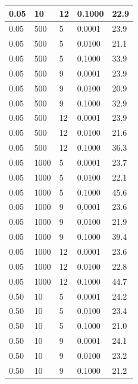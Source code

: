 \begin{table}[h!]
\begin{center}
\begin{tabular}{|l|l|l|l|l|}
\hline 0.05 & 10 & 12 & 0.1000 & 22.9 \\
\hline 0.05 & 500 & 5 & 0.0001 & 23.9 \\
\hline 0.05 & 500 & 5 & 0.0100 & 21.1 \\
\hline 0.05 & 500 & 5 & 0.1000 & 33.9 \\
\hline 0.05 & 500 & 9 & 0.0001 & 23.9 \\
\hline 0.05 & 500 & 9 & 0.0100 & 20.9 \\
\hline 0.05 & 500 & 9 & 0.1000 & 32.9 \\
\hline 0.05 & 500 & 12 & 0.0001 & 23.9 \\
\hline 0.05 & 500 & 12 & 0.0100 & 21.6 \\
\hline 0.05 & 500 & 12 & 0.1000 & 36.3 \\
\hline 0.05 & 1000 & 5 & 0.0001 & 23.7 \\
\hline 0.05 & 1000 & 5 & 0.0100 & 22.1 \\
\hline 0.05 & 1000 & 5 & 0.1000 & 45.6 \\
\hline 0.05 & 1000 & 9 & 0.0001 & 23.6 \\
\hline 0.05 & 1000 & 9 & 0.0100 & 21.9 \\
\hline 0.05 & 1000 & 9 & 0.1000 & 39.4 \\
\hline 0.05 & 1000 & 12 & 0.0001 & 23.6 \\
\hline 0.05 & 1000 & 12 & 0.0100 & 22.8 \\
\hline 0.05 & 1000 & 12 & 0.1000 & 44.7 \\
\hline 0.50 & 10 & 5 & 0.0001 & 24.2 \\
\hline 0.50 & 10 & 5 & 0.0100 & 23.4 \\
\hline 0.50 & 10 & 5 & 0.1000 & 21.0 \\
\hline 0.50 & 10 & 9 & 0.0001 & 24.1 \\
\hline 0.50 & 10 & 9 & 0.0100 & 23.2 \\
\hline 0.50 & 10 & 9 & 0.1000 & 21.2 \\
\hline
	\end{tabular}
	\end{center}
\end{table}

\newpage

